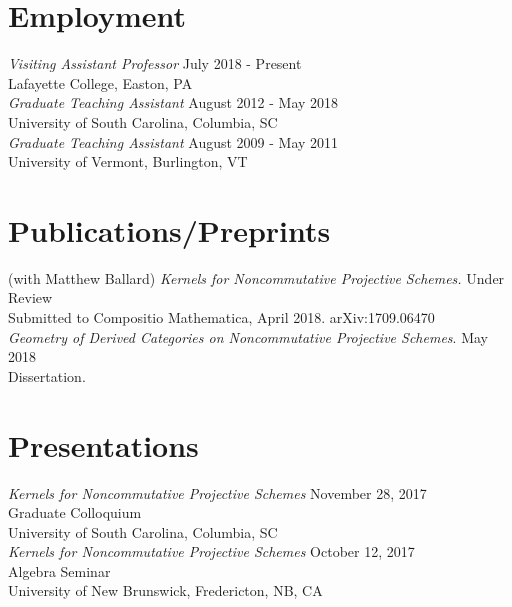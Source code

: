 \documentclass{article}
\begin{document}
\section*{Employment}
\textsl{Visiting Assistant Professor} \hfill July 2018 - Present\\
Lafayette College, Easton, PA\\

\noindent \textsl{Graduate Teaching Assistant} \hfill August 2012 - May 2018 \\
University of South Carolina, Columbia, SC\\

\noindent\textsl{Graduate Teaching Assistant} \hfill August 2009 - May 2011 \\
University of Vermont, Burlington, VT\\


\newpage

\section*{Publications/Preprints}
(with Matthew Ballard)  \textsl{Kernels for Noncommutative Projective Schemes.} 
\hfill Under Review\\
Submitted to Compositio Mathematica, April 2018. arXiv:1709.06470\\

\noindent\textsl{Geometry of Derived Categories on Noncommutative Projective Schemes}. \hfill May 2018\\
Dissertation.

\section*{Presentations}
\textsl{Kernels for Noncommutative Projective Schemes} \hfill November 28, 2017\\
Graduate Colloquium\\
University of South Carolina, Columbia, SC\\

\noindent\textsl{Kernels for Noncommutative Projective Schemes} \hfill October 12, 2017\\
Algebra Seminar\\
University of New Brunswick, Fredericton, NB, CA\\
\end{document}
